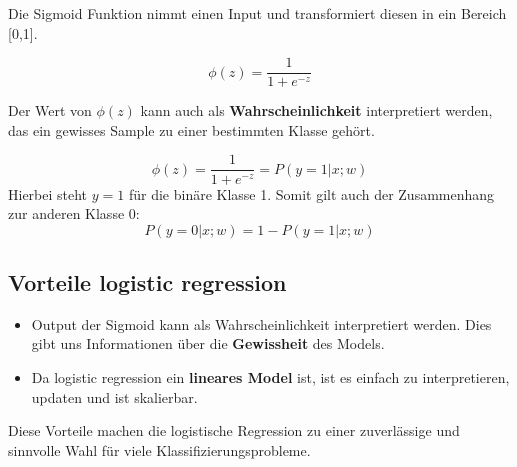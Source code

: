 Die Sigmoid Funktion nimmt einen Input und transformiert diesen in ein Bereich [0,1].



$$ \phi(z) = \frac{1}{1 + e^{-z}} $$

Der Wert von $\phi(z)$ kann auch als \textbf{Wahrscheinlichkeit} interpretiert werden, das ein gewisses Sample zu einer bestimmten Klasse gehört.


$$ \phi(z) = \frac{1}{1 + e^{-z}} = P(y=1 | x;w) $$
Hierbei steht $y=1$ für die binäre Klasse 1.
Somit gilt auch der Zusammenhang zur anderen Klasse 0:
$$ P(y=0|x;w) = 1 - P(y=1|x;w)$$


\subsection{Vorteile logistic regression}

\begin{itemize}
	\item Output der Sigmoid kann als Wahrscheinlichkeit interpretiert werden. Dies gibt uns Informationen über die \textbf{Gewissheit} des Models.
	\item Da logistic regression ein \textbf{lineares Model} ist, ist es einfach zu interpretieren, updaten und ist skalierbar.
\end{itemize}

Diese Vorteile machen die logistische Regression zu einer zuverlässige und sinnvolle Wahl für viele Klassifizierungsprobleme.




